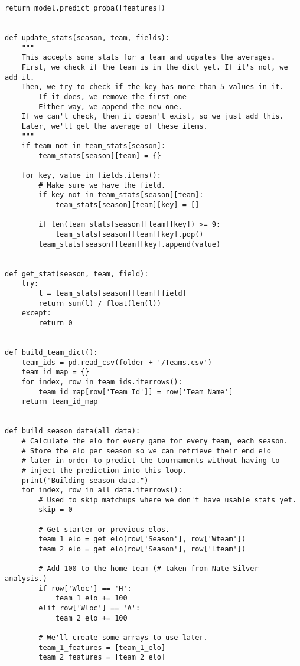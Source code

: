 \documentclass[onecolumn, draftclsnofoot,10pt, compsoc]{IEEEtran}
\begin{document}
\begin{lstlisting}[caption={mm.py, where basketball statistics are read and fed into Scikit-Learn machine learning algorithms. Then, the resulting March Madness bracket is generated.}]
    return model.predict_proba([features])


def update_stats(season, team, fields):
    """
    This accepts some stats for a team and udpates the averages.
    First, we check if the team is in the dict yet. If it's not, we add it.
    Then, we try to check if the key has more than 5 values in it.
        If it does, we remove the first one
        Either way, we append the new one.
    If we can't check, then it doesn't exist, so we just add this.
    Later, we'll get the average of these items.
    """
    if team not in team_stats[season]:
        team_stats[season][team] = {}

    for key, value in fields.items():
        # Make sure we have the field.
        if key not in team_stats[season][team]:
            team_stats[season][team][key] = []

        if len(team_stats[season][team][key]) >= 9:
            team_stats[season][team][key].pop()
        team_stats[season][team][key].append(value)


def get_stat(season, team, field):
    try:
        l = team_stats[season][team][field]
        return sum(l) / float(len(l))
    except:
        return 0


def build_team_dict():
    team_ids = pd.read_csv(folder + '/Teams.csv')
    team_id_map = {}
    for index, row in team_ids.iterrows():
        team_id_map[row['Team_Id']] = row['Team_Name']
    return team_id_map


def build_season_data(all_data):
    # Calculate the elo for every game for every team, each season.
    # Store the elo per season so we can retrieve their end elo
    # later in order to predict the tournaments without having to
    # inject the prediction into this loop.
    print("Building season data.")
    for index, row in all_data.iterrows():
        # Used to skip matchups where we don't have usable stats yet.
        skip = 0

        # Get starter or previous elos.
        team_1_elo = get_elo(row['Season'], row['Wteam'])
        team_2_elo = get_elo(row['Season'], row['Lteam'])

        # Add 100 to the home team (# taken from Nate Silver analysis.)
        if row['Wloc'] == 'H':
            team_1_elo += 100
        elif row['Wloc'] == 'A':
            team_2_elo += 100

        # We'll create some arrays to use later.
        team_1_features = [team_1_elo]
        team_2_features = [team_2_elo]


\end{lstlisting}
\end{document}
